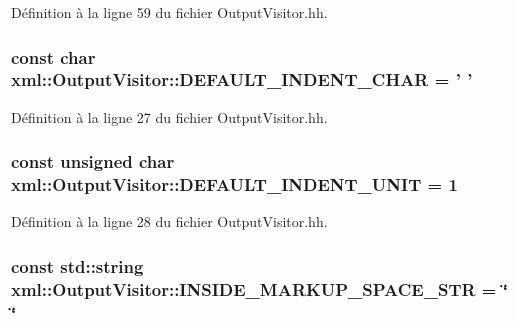 Définition à la ligne 59 du fichier OutputVisitor.hh.

\hypertarget{classxml_1_1_output_visitor_ad61c526a1962865b37f22fdf252b63f3}{
\subsubsection[{DEFAULT\_\-INDENT\_\-CHAR}]{\setlength{\rightskip}{0pt plus 5cm}const char {\bf xml::OutputVisitor::DEFAULT\_\-INDENT\_\-CHAR} = ' '}}
\label{classxml_1_1_output_visitor_ad61c526a1962865b37f22fdf252b63f3}


Définition à la ligne 27 du fichier OutputVisitor.hh.

\hypertarget{classxml_1_1_output_visitor_aa5e9426f0fdf70d3e0922837c8c99f93}{
\subsubsection[{DEFAULT\_\-INDENT\_\-UNIT}]{\setlength{\rightskip}{0pt plus 5cm}const unsigned char {\bf xml::OutputVisitor::DEFAULT\_\-INDENT\_\-UNIT} = 1}}
\label{classxml_1_1_output_visitor_aa5e9426f0fdf70d3e0922837c8c99f93}


Définition à la ligne 28 du fichier OutputVisitor.hh.

\hypertarget{classxml_1_1_output_visitor_a67d0548ce8906eb4121d9f33d005c8be}{
\subsubsection[{INSIDE\_\-MARKUP\_\-SPACE\_\-STR}]{\setlength{\rightskip}{0pt plus 5cm}const std::string {\bf xml::OutputVisitor::INSIDE\_\-MARKUP\_\-SPACE\_\-STR} = \char`\"{} \char`\"{}}}
\label{classxml_1_1_output_visitor_a67d0548ce8906eb4121d9f33d005c8be}


